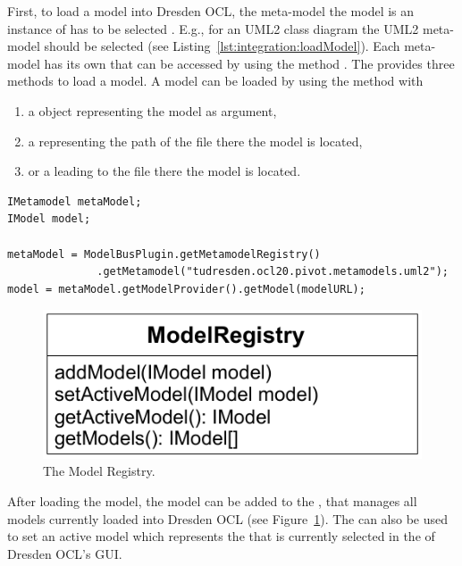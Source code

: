 First, to load a model into Dresden OCL, the meta-model the model is an instance
of has to be selected . E.g., for an \acs{UML}2 class diagram the \acs{UML}2 
meta-model should be selected (see Listing~\ref{lst:integration:loadModel}).
Each meta-model has its own  that can be accessed by using 
the method . The  
provides three methods to load a model. A model can be loaded by using the 
method  with

\begin{enumerate}
	\item a  object representing the model as argument,
	\item a  representing the path of the file there the model is 
	  located,
	\item or a  leading to the file there the model is located.
\end{enumerate}

\lstset{
  language=Java
}
\begin{lstlisting}[caption={How to load a model.}, captionpos=b, label=lst:integration:loadModel, float]
IMetamodel metaModel;
IModel model;

metaModel = ModelBusPlugin.getMetamodelRegistry()
              .getMetamodel("tudresden.ocl20.pivot.metamodels.uml2");
model = metaModel.getModelProvider().getModel(modelURL);
\end{lstlisting}

\begin{figure}[!b]
	\centering
	\includegraphics[width=.55\linewidth]{figures/integration/modelRegistry}
	\caption{The Model Registry.}
	\label{pic:integration:modelRegistry}
\end{figure}

After loading the model, the model can be added to the ,
that manages all models currently loaded into Dresden OCL (see 
Figure~\ref{pic:integration:modelRegistry}). The  can also 
be used to set an active model which represents the  that is 
currently selected in the  of Dresden OCL's GUI.


